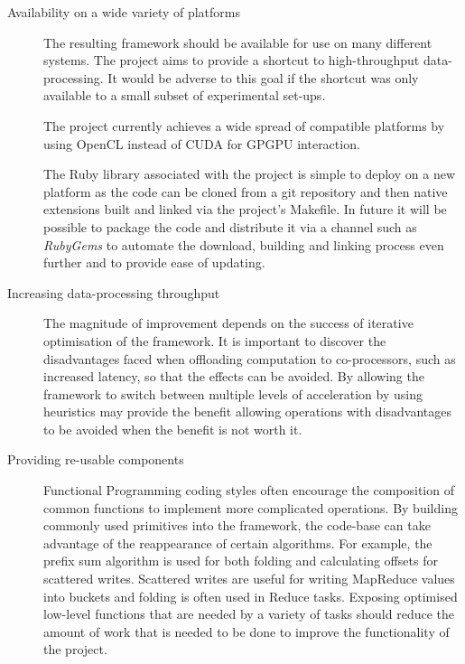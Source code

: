 \begin{description}
  \item[Availability on a wide variety of platforms]
  The resulting framework should be available for use on many different systems. The project aims to provide a shortcut to high-throughput data-processing. It would be adverse to this goal if the shortcut was only available to a small subset of experimental set-ups.

  The project currently achieves a wide spread of compatible platforms by using OpenCL instead of CUDA for GPGPU interaction.

  The Ruby library associated with the project is simple to deploy on a new platform as the code can be cloned from a git repository and then native extensions built and linked via the project's Makefile. In future it will be possible to package the code and distribute it via a channel such as \emph{RubyGems}\cite{rubygems} to automate the download, building and linking process even further and to provide ease of updating.

  \item[Increasing data-processing throughput]
  The magnitude of improvement depends on the success of iterative optimisation of the framework. It is important to discover the disadvantages faced when offloading computation to co-processors, such as increased latency, so that the effects can be avoided. By allowing the framework to switch between multiple levels of acceleration by using heuristics may provide the benefit allowing operations with disadvantages to be avoided when the benefit is not worth it.

  \item[Providing re-usable components]
  Functional Programming coding styles often encourage the composition of common functions to implement more complicated operations. By building commonly used primitives into the framework, the code-base can take advantage of the reappearance of certain algorithms. For example, the prefix sum algorithm is used for both folding and calculating offsets for scattered writes. Scattered writes are useful for writing MapReduce values into buckets and folding is often used in Reduce tasks. Exposing optimised low-level functions that are needed by a variety of tasks should reduce the amount of work that is needed to be done to improve the functionality of the project.

\end{description}

